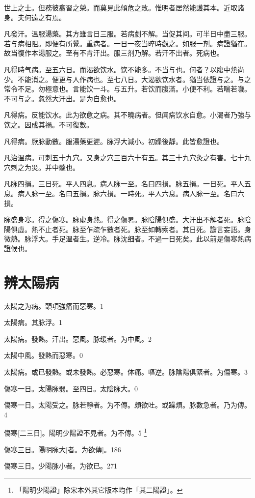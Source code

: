 \documentclass[oneside,b4paper]{ctexbook}
\begin{document}
\begin{flushleft}
世上之士。但務彼翕習之榮。而莫見此傾危之敗。惟明者居然能護其本。近取諸身。夫何遠之有焉。

凡發汗。温服湯藥。其方雖言日三服。若病劇不解。当促其间。可半日中盡三服。若与病相阻。即便有所覺。重病者。一日一夜当晬時觀之。如服一剂。病證猶在。故当復作本湯服之。至有不肯汗出。服三剂乃解。若汗不出者。死病也。

凡得時气病。至五六日。而渴欲饮水。饮不能多。不当与也。何者？以腹中熱尚少。不能消之。便更与人作病也。至七八日。大渴欲饮水者。猶当依證与之。与之常令不足。勿極意也。言能饮一斗。与五升。若饮而腹滿。小便不利。若喘若噦。不可与之。忽然大汗出。是为自愈也。

凡得病。反能饮水。此为欲愈之病。其不曉病者。但闻病饮水自愈。小渴者乃強与饮之。因成其禍。不可復數。

凡得病。厥脉動數。服湯藥更遲。脉浮大減小。初躁後靜。此皆愈證也。

凡治温病。可刺五十九穴。又身之穴三百六十有五。其三十九穴灸之有害。七十九穴刺之为災。并中髓也。

凡脉四損。三日死。平人四息。病人脉一至。名曰四損。脉五損。一日死。平人五息。病人脉一至。名曰五損。脉六損。一時死。平人六息。病人脉一至。名曰六損。

脉盛身寒。得之傷寒。脉虛身熱。得之傷暑。脉陰陽俱盛。大汗出不解者死。脉陰陽俱虛。熱不止者死。脉至乍疏乍數者死。脉至如轉索者。其日死。譫言妄語。身微熱。脉浮大。手足温者生。逆冷。脉沈细者。不過一日死矣。此以前是傷寒熱病證候也。

\chapter{辨太陽病}

太陽之为病。頭項強痛而惡寒。1

太陽病。其脉浮。1

太陽病。發熱。汗出。惡風。脉缓者。为中風。2

太陽中風。發熱而惡寒。0

太陽病。或已發熱。或未發熱。必惡寒。体痛。嘔逆。脉陰陽俱緊者。为傷寒。3

傷寒一日。太陽脉弱。至四日。太陰脉大。0

傷寒一日。太陽受之。脉若靜者。为不傳。頗欲吐。或躁煩。脉數急者。乃为傳。4

傷寒[二三日]。陽明少陽證不見者。为不傳。5
\footnote{「陽明少陽證」除宋本外其它版本均作「其二陽證」。}

傷寒三日。陽明脉大[者。为欲傳]。186

傷寒三日。少陽脉小者。为欲已。271


\end{flushleft}
\end{document}
